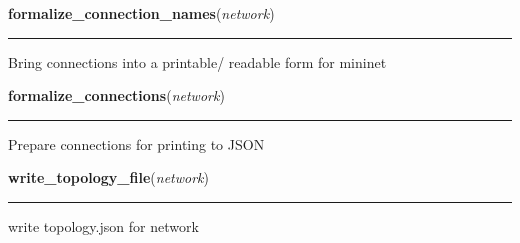    \label{initialize_system:Write_Jsons:formalize_connection_names}

    \vspace{0.5ex}

\hspace{.8\funcindent}\begin{boxedminipage}{\funcwidth}

    \raggedright \textbf{formalize\_connection\_names}(\textit{network})

    \vspace{-1.5ex}

    \rule{\textwidth}{0.5\fboxrule}
\setlength{\parskip}{2ex}
    Bring connections into a printable/ readable form for mininet

\setlength{\parskip}{1ex}
    \end{boxedminipage}

    \label{initialize_system:Write_Jsons:formalize_connections}

    \vspace{0.5ex}

\hspace{.8\funcindent}\begin{boxedminipage}{\funcwidth}

    \raggedright \textbf{formalize\_connections}(\textit{network})

    \vspace{-1.5ex}

    \rule{\textwidth}{0.5\fboxrule}
\setlength{\parskip}{2ex}
    Prepare connections for printing to JSON

\setlength{\parskip}{1ex}
    \end{boxedminipage}

    \label{initialize_system:Write_Jsons:write_topology_file}

    \vspace{0.5ex}

\hspace{.8\funcindent}\begin{boxedminipage}{\funcwidth}

    \raggedright \textbf{write\_topology\_file}(\textit{network})

    \vspace{-1.5ex}

    \rule{\textwidth}{0.5\fboxrule}
\setlength{\parskip}{2ex}
    write topology.json for network

\setlength{\parskip}{1ex}
    \end{boxedminipage}


